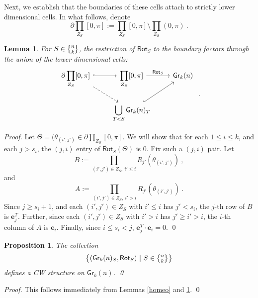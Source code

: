 \documentclass{article}
\newcommand{\msf}[1]{\mathsf{#1}}
\newcommand{\mbf}[1]{\mathbf{#1}}
\newcommand{\gr}{\msf{Gr}}
\newcommand{\nchoosek}{\textstyle\genfrac{\lbrace}{\rbrace}{0pt}{}}
\newcommand{\rot}{\msf{Rot}}
\newcommand{\trot}{\widetilde{\msf{Rot}}}
\newcommand{\e}{\mbf{e}}
\newtheorem{proposition}[theorem]{Proposition}
\newtheorem{lemma}[theorem]{Lemma}
\theoremstyle{definition}
\begin{document}
Next, we establish that the boundaries of these cells attach to strictly lower dimensional cells. In what follows, 
denote
$$\partial \prod_{Z_S} [0,\pi] := \prod_{Z_S} [0,\pi] \setminus \prod_{Z_S} (0,\pi)~.$$
\begin{lemma}\label{boundary}
    For $S \in \nchoosek{n}{k}$, the restriction of $\rot_S$ to the boundary factors through the union of the lower
    dimensional cells:
    $$\begin{tikzcd}
        \partial \displaystyle\prod_{Z_S} [0,\pi]  \arrow[r,hook] \arrow[dr,dashed] & \displaystyle\prod_{Z_S}[0,\pi]  
            \arrow[r,"\rot_S"] & \gr_k(n) \\
        & \displaystyle\bigcup_{T <S} \gr_k(n)_T \arrow[ur, hook] & 
        \end{tikzcd}~.$$
\end{lemma}
{\it Proof.} Let $\Theta=(\theta_{(i',j')} \in \partial \displaystyle\prod_{Z_S} [0,\pi]$. 
We will show that for each $1 \le i \le k$, and each $j>s_i$, the $(j,i)$ entry of $\trot_S(\Theta)$ is 0. Fix such a
$(j,i)$ pair. Let 
$$B:= \prod\limits_{(i',j') \in Z_S,~i'\le i} R_{j'}(\theta_{(i',j')})~,$$
and
$$A := \prod\limits_{(i',j') \in Z_S,~i'>i} R_{j'}(\theta_{(i',j')})~.$$
Since $j\ge s_i+1$, and each $(i',j') \in Z_S$ with $i'\le i$ has $j' <s_i$, the $j$-th row of $B$ is $\e_j^T$. Further,
since each $(i',j') \in Z_S$ with $i'>i$ has $j'\ge i'>i$, the $i$-th column of $A$ is $\e_i$. Finally, since
$i\le s_i < j$, $\e_j^T \cdot \e_i = 0$.
\qed \\

\begin{proposition}
    The collection
    $$\left\{(\gr_k(n)_S, \rot_S) ~|~ S \in \nchoosek{n}{k} \right\}$$
    defines a CW structure on $\gr_k(n)$. \qed
\end{proposition}
{\it Proof.} This follows immediately from Lemmas \ref{homeo} and \ref{boundary}. 
\qed \\
\end{document}
